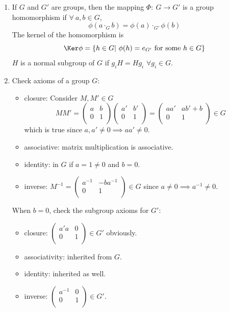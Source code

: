 \documentclass[a4paper]{article}
\begin{document}
\begin{ans}\leavevmode
\begin{enumerate}[label=(\alph*)]
\item If $G$ and $G'$ are groups, then the mapping $\Phi:~G\rightarrow G'$ is a group homomorphism if $\forall~a,b\in G$,
$$\phi(a\cdot_Gb)=\phi(a)\cdot_{G'}\phi(b)$$
The kernel of the homomorphism is
$$\Ker\phi=\{h\in G|~\phi(h)=e_{G'}\text{ for some } h\in G\}$$
$H$ is a normal subgroup of $G$ if $g_iH=Hg_i$ $\forall g_i\in G$.
\item Check axioms of a group $G$:
\begin{itemize}
    \item closure: Consider $M,M'\in G$ 
    $$MM'=\begin{pmatrix}a&b\\0&1\\\end{pmatrix}\begin{pmatrix}a'&b'\\0&1\\\end{pmatrix}=\begin{pmatrix}aa'&ab'+b\\0&1\\\end{pmatrix}\in G$$
    which is true since $a,a'\neq 0\implies aa'\neq 0$.
    \item associative: matrix multiplication is associative.
    \item identity: in $G$ if $a=1\neq 0$ and $b=0$.
    \item inverse: $M^{-1}=\begin{pmatrix}a^{-1}&-ba^{-1}\\0&1\\\end{pmatrix}\in G$ since $a\neq0\implies a^{-1}\neq 0$.
\end{itemize}
When $b=0$, check the subgroup axioms for $G'$:
\begin{itemize}
    \item closure: $\begin{pmatrix}a'a&0\\0&1\\\end{pmatrix}\in G'$ obviously.
    \item associativity: inherited from $G$.
    \item identity: inherited as well.
    \item inverse: $\begin{pmatrix}a^{-1}&0\\0&1\\\end{pmatrix}\in G'$.

\end{itemize}
\end{enumerate}
\end{ans}
\end{document}
